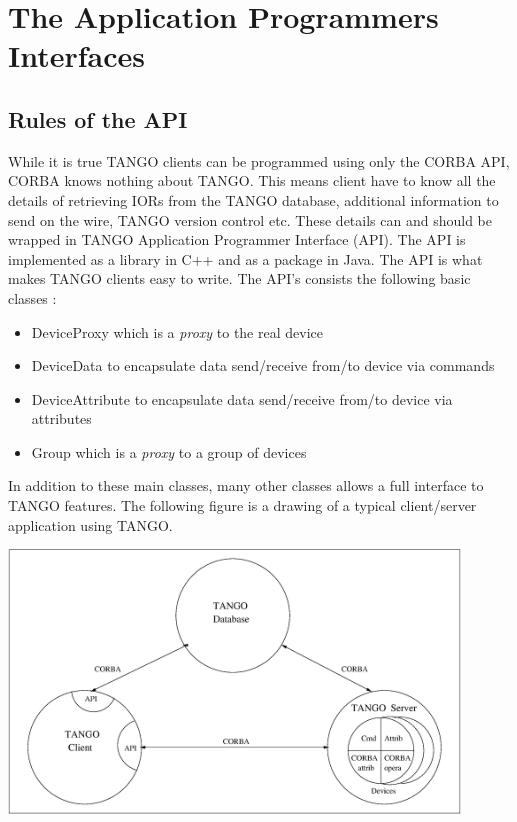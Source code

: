 \section{The Application Programmers Interfaces}


\subsection{Rules of the API}

While it is true TANGO clients can be programmed using only the CORBA
API, CORBA knows nothing about TANGO. This means client have to know
all the details of retrieving IORs from the TANGO database, additional
information to send on the wire, TANGO version control etc. These
details can and should be wrapped in TANGO Application Programmer
Interface (API). The API is implemented as a library in C++ and as
a package in Java. The API is what makes TANGO clients easy to write.
The API's consists the following basic classes :
\begin{itemize}
\item DeviceProxy which is a \emph{proxy} to the real device
\item DeviceData to encapsulate data send/receive from/to device via commands
\item DeviceAttribute to encapsulate data send/receive from/to device via
attributes
\item Group which is a \emph{proxy} to a group of devices
\end{itemize}
In addition to these main classes, many other classes allows a full
interface to TANGO features. The following figure is a drawing of
a typical client/server application using TANGO.

\vspace{0.3cm}


\begin{center}
\includegraphics[width=12cm,height=7cm]{ds_model/archi}
\par\end{center}

